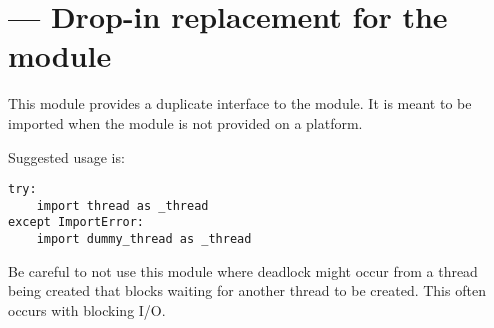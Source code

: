 \section{ ---
         Drop-in replacement for the  module}


This module provides a duplicate interface to the  module. It
is meant to be imported when the  module is not provided on a
platform.

Suggested usage is:

\begin{verbatim}
try:
    import thread as _thread
except ImportError:
    import dummy_thread as _thread
\end{verbatim}

Be careful to not use this module where deadlock might occur from a thread 
being created that blocks waiting for another thread to be created.  This 
often occurs with blocking I/O.

